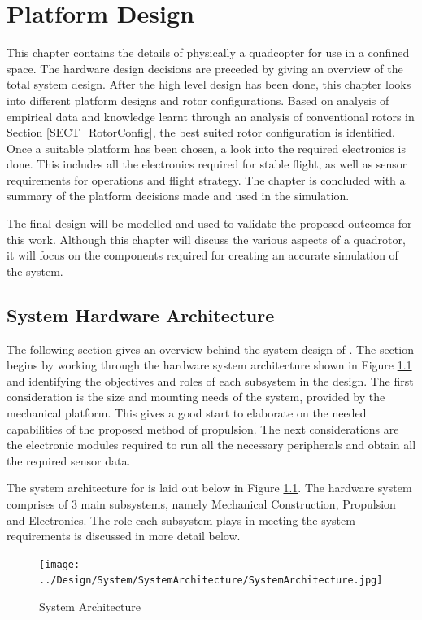 \chapter{Platform Design}
This chapter contains the details of physically a quadcopter for use in a confined space. The hardware design decisions are preceded by giving an overview of the total system design. After the high level design has been done, this chapter looks into different platform designs and rotor configurations. Based on analysis of empirical data and knowledge learnt through an analysis of conventional rotors in Section \ref{SECT_RotorConfig}, the best suited rotor configuration is identified. Once a suitable platform has been chosen, a look into the required electronics is done. This includes all the electronics required for stable flight, as well as sensor requirements for operations and flight strategy. The chapter is concluded with a summary of the platform decisions made and used in the simulation.

The final design will be modelled and used to validate the proposed outcomes for this work. Although this chapter will discuss the various aspects of a quadrotor, it will focus on the components required for creating an accurate simulation of the system.

	\section{System Hardware Architecture}
	The following section gives an overview behind the system design of \projectName. The section begins by working through the hardware system architecture shown in Figure \ref{IM_SystemArchitecture} and identifying the objectives and roles of each subsystem in the design. The first consideration is the size and mounting needs of the system, provided by the mechanical platform. This gives a good start to elaborate on the needed capabilities of the proposed method of propulsion. The next considerations are the electronic modules required to run all the necessary peripherals and obtain all the required sensor data.
	
	The system architecture for \projectName is laid out below in Figure \ref{IM_SystemArchitecture}. The hardware system comprises of 3 main subsystems, namely Mechanical Construction, Propulsion and Electronics. The role each subsystem plays in meeting the system requirements is discussed in more detail below.
	
	\begin{figure}[H]
		\centering
		\texttt{[image: ../Design/System/SystemArchitecture/SystemArchitecture.jpg]}
		\caption{System Architecture}
		\label{IM_SystemArchitecture}
	\end{figure}

